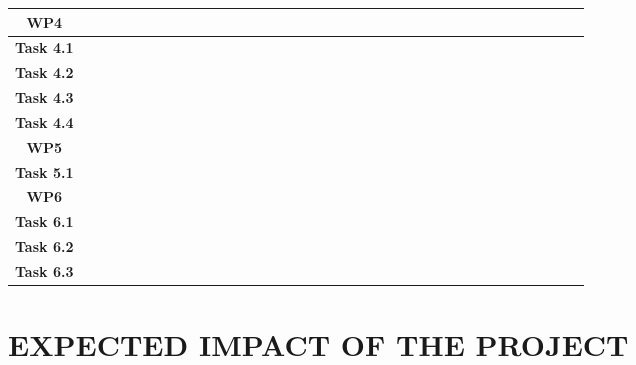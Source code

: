 \documentclass[a4paper,11pt]{nprp}
\begin{document}
{\begin{tabular}{|c|c|c|c|c|c|c|c|c|c|c|c|c|c|c|c|c|c|c|c|c|c|c|c|c|c|c|c|c|c|c|c|c|c|c|c|c|}
\hline
 \textbf{WP4}      &  &  &  &  &  &  &  &  &  &  &  &
         & \w & \w & \w & \w & \w & \w & \w & \w & \w & \w & \w & \w
         & \w & \w & \w & \w & \w & \w & \w & \w & \w & \w & \w & \w\tabularnewline
\hline
 \textbf{Task 4.1} &  &  &  &  &  &  &  &  &  &  &  &
         & \s & \s & \s & \s & \s & \s &  &  &  &  &  &
         &  &  &  &  &  &  &  &  &  &  &  & \tabularnewline
\hline
 \textbf{Task 4.2} &  &  &  &  &  &  &  &  &  &  &  &
         &  &  &  & \s & \s & \s & \s & \s & \s & \s & \s & \s
         &  &  &  &  &  &  &  &  &  &  &  & \tabularnewline
\hline
 \textbf{Task 4.3} &  &  &  &  &  &  &  &  &  &  &  &
         &  &  &  &  &  &  & \s & \s & \s & \s & \s & \s
         & \s & \s & \s & \s & \s & \s &  &  &  &  &  & \tabularnewline
\hline
 \textbf{Task 4.4} &  &  &  &  &  &  &  &  &  &  &  &
         &  &  &  &  &  &  & \s & \s & \s & \s & \s & \s
         & \s & \s & \s & \s & \s & \s & \s & \s & \s & \s & \s & \s \tabularnewline
\hline
 \textbf{WP5}      & \w & \w & \w & \w & \w & \w & \w & \w & \w & \w & \w & \w
         & \w & \w & \w & \w & \w & \w & \w & \w & \w & \w & \w & \w
         & \w & \w & \w & \w & \w & \w & \w & \w & \w & \w & \w & \w \tabularnewline
\hline
 \textbf{Task 5.1} & \s & \s & \s & \s & \s & \s & \s & \s & \s & \s & \s & \s
         & \s & \s & \s & \s & \s & \s & \s & \s & \s & \s & \s & \s
         & \s & \s & \s & \s & \s & \s & \s & \s & \s & \s & \s & \s \tabularnewline
\hline
 \textbf{WP6}      & \w & \w & \w & \w & \w & \w & \w & \w & \w & \w & \w & \w
         & \w & \w & \w & \w & \w & \w & \w & \w & \w & \w & \w & \w
         & \w & \w & \w & \w & \w & \w & \w & \w & \w & \w & \w & \w \tabularnewline
\hline
 \textbf{Task 6.1} & \s & \s & \s & \s & \s & \s & \s & \s & \s & \s & \s & \s
         & \s & \s & \s & \s & \s & \s & \s & \s & \s & \s & \s & \s
         & \s & \s & \s & \s & \s & \s & \s & \s & \s & \s & \s & \s \tabularnewline
\hline
 \textbf{Task 6.2} &  &  &  &  &  &  & \s & \s & \s & \s & \s & \s
         & \s & \s & \s & \s & \s & \s & \s & \s & \s & \s & \s & \s
         & \s & \s & \s & \s & \s & \s & \s & \s & \s & \s & \s & \s \tabularnewline
\hline
 \textbf{Task 6.3} &  &  &  &  &  &  &  &  &  &  &  &
         & \s & \s & \s & \s & \s & \s & \s & \s & \s & \s & \s & \s
         & \s & \s & \s & \s & \s & \s & \s & \s & \s & \s & \s & \s \tabularnewline
\hline
\end{tabular}
}

\useportrait

\section{EXPECTED IMPACT OF THE PROJECT}
\label{sec:impact}
\end{document}
